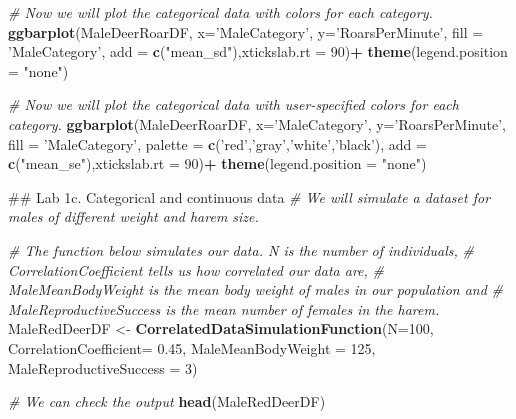 \documentclass[]{book}
\newenvironment{Shaded}{\begin{snugshade}}{\end{snugshade}}
\newcommand{\CommentTok}[1]{\textcolor[rgb]{0.56,0.35,0.01}{\textit{#1}}}
\newcommand{\DataTypeTok}[1]{\textcolor[rgb]{0.13,0.29,0.53}{#1}}
\newcommand{\DecValTok}[1]{\textcolor[rgb]{0.00,0.00,0.81}{#1}}
\newcommand{\FloatTok}[1]{\textcolor[rgb]{0.00,0.00,0.81}{#1}}
\newcommand{\KeywordTok}[1]{\textcolor[rgb]{0.13,0.29,0.53}{\textbf{#1}}}
\newcommand{\NormalTok}[1]{#1}
\newcommand{\OperatorTok}[1]{\textcolor[rgb]{0.81,0.36,0.00}{\textbf{#1}}}
\newcommand{\StringTok}[1]{\textcolor[rgb]{0.31,0.60,0.02}{#1}}
\begin{document}
\begin{Shaded}
\begin{Highlighting}[]
\CommentTok{# Now we will plot the categorical data with colors for each category.}
\KeywordTok{ggbarplot}\NormalTok{(MaleDeerRoarDF, }\DataTypeTok{x=}\StringTok{'MaleCategory'}\NormalTok{, }\DataTypeTok{y=}\StringTok{'RoarsPerMinute'}\NormalTok{, }\DataTypeTok{fill =} \StringTok{'MaleCategory'}\NormalTok{,}
          \DataTypeTok{add =} \KeywordTok{c}\NormalTok{(}\StringTok{"mean_sd"}\NormalTok{),}\DataTypeTok{xtickslab.rt =} \DecValTok{90}\NormalTok{)}\OperatorTok{+}\StringTok{ }\KeywordTok{theme}\NormalTok{(}\DataTypeTok{legend.position =} \StringTok{"none"}\NormalTok{)}

\CommentTok{# Now we will plot the categorical data with user-specified colors for each category.}
\KeywordTok{ggbarplot}\NormalTok{(MaleDeerRoarDF, }\DataTypeTok{x=}\StringTok{'MaleCategory'}\NormalTok{, }\DataTypeTok{y=}\StringTok{'RoarsPerMinute'}\NormalTok{, }\DataTypeTok{fill =} \StringTok{'MaleCategory'}\NormalTok{,}
          \DataTypeTok{palette =} \KeywordTok{c}\NormalTok{(}\StringTok{'red'}\NormalTok{,}\StringTok{'gray'}\NormalTok{,}\StringTok{'white'}\NormalTok{,}\StringTok{'black'}\NormalTok{),}
          \DataTypeTok{add =} \KeywordTok{c}\NormalTok{(}\StringTok{"mean_se"}\NormalTok{),}\DataTypeTok{xtickslab.rt =} \DecValTok{90}\NormalTok{)}\OperatorTok{+}\StringTok{ }\KeywordTok{theme}\NormalTok{(}\DataTypeTok{legend.position =} \StringTok{"none"}\NormalTok{)}


\NormalTok{## Lab 1c. Categorical and continuous data}
\CommentTok{# We will simulate a dataset for males of different weight and harem size.}

\CommentTok{# The function below simulates our data. N is the number of individuals,   }
\CommentTok{# CorrelationCoefficient tells us how correlated our data are,  }
\CommentTok{# MaleMeanBodyWeight is the mean body weight of males in our population and }
\CommentTok{# MaleReproductiveSuccess is the mean number of females in the harem.}
\NormalTok{MaleRedDeerDF <-}\StringTok{ }\KeywordTok{CorrelatedDataSimulationFunction}\NormalTok{(}\DataTypeTok{N=}\DecValTok{100}\NormalTok{, }
                                                  \DataTypeTok{CorrelationCoefficient=} \FloatTok{0.45}\NormalTok{,}
                                                  \DataTypeTok{MaleMeanBodyWeight =} \DecValTok{125}\NormalTok{,}
                                                  \DataTypeTok{MaleReproductiveSuccess =} \DecValTok{3}\NormalTok{)}

\CommentTok{# We can check the output}
\KeywordTok{head}\NormalTok{(MaleRedDeerDF)}


\end{Highlighting}
\end{Shaded}
\end{document}
